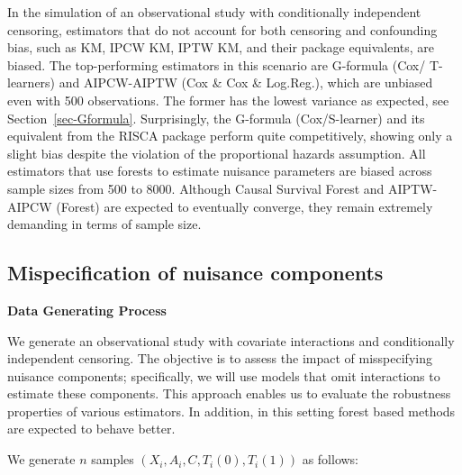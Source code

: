 \documentclass[
  11pt,
  a4paper,
]{article}
\theoremstyle{plain}
\theoremstyle{plain}
\theoremstyle{plain}
\theoremstyle{definition}
\theoremstyle{remark}
\begin{document}
In the simulation of an observational study with conditionally
independent censoring, estimators that do not account for both censoring
and confounding bias, such as KM, IPCW KM, IPTW KM, and their package
equivalents, are biased. The top-performing estimators in this scenario
are G-formula (Cox/ T-learners) and AIPCW-AIPTW (Cox \& Cox \&
Log.Reg.), which are unbiased even with 500 observations. The former has
the lowest variance as expected, see Section~\ref{sec-Gformula}.
Surprisingly, the G-formula (Cox/S-learner) and its equivalent from the
RISCA package perform quite competitively, showing only a slight bias
despite the violation of the proportional hazards assumption. All
estimators that use forests to estimate nuisance parameters are biased
across sample sizes from 500 to 8000. Although Causal Survival Forest
and AIPTW-AIPCW (Forest) are expected to eventually converge, they
remain extremely demanding in terms of sample size.

\subsection{Mispecification of nuisance
components}\label{mispecification-of-nuisance-components}

\textbf{Data Generating Process}

We generate an observational study with covariate interactions and
conditionally independent censoring. The objective is to assess the
impact of misspecifying nuisance components; specifically, we will use
models that omit interactions to estimate these components. This
approach enables us to evaluate the robustness properties of various
estimators. In addition, in this setting forest based methods are
expected to behave better.

We generate \(n\) samples \((X_{i},A_{i},C,T_{i}(0), T_{i}(1))\) as
follows:
\end{document}
